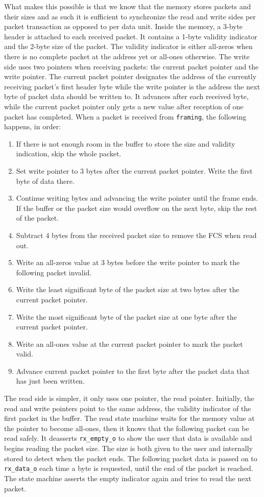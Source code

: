 \documentclass[a4paper, 11pt, oneside]{Thesis}  %
\begin{document}
What makes this possible is that we know that the memory stores packets and their sizes and as such it is sufficient to synchronize the read and write sides per packet transaction as opposed to per data unit. Inside the memory, a 3-byte header is attached to each received packet. It contains a 1-byte validity indicator and the 2-byte size of the packet. The validity indicator is either all-zeros when there is no complete packet at the address yet or all-ones otherwise. The write side uses two pointers when receiving packets: the current packet pointer and the write pointer. The current packet pointer designates the address of the currently receiving packet's first header byte while the write pointer is the address the next byte of packet data should be written to. It advances after each received byte, while the current packet pointer only gets a new value after reception of one packet has completed. When a packet is received from \texttt{framing}, the following happens, in order:
\begin{enumerate}
\item If there is not enough room in the buffer to store the size and validity indication, skip the whole packet.
\item Set write pointer to 3 bytes after the current packet pointer. Write the first byte of data there.
\item Continue writing bytes and advancing the write pointer until the frame ends. If the buffer or the packet size would overflow on the next byte, skip the rest of the packet.
\item Subtract 4 bytes from the received packet size to remove the FCS when read out.
\item Write an all-zeros value at 3 bytes before the write pointer to mark the following packet invalid.
\item Write the least significant byte of the packet size at two bytes after the current packet pointer.
\item Write the most significant byte of the packet size at one byte after the current packet pointer.
\item Write an all-ones value at the current packet pointer to mark the packet valid.
\item Advance current packet pointer to the first byte after the packet data that has just been written.
\end{enumerate}

The read side is simpler, it only uses one pointer, the read pointer. Initially, the read and write pointers point to the same address, the validity indicator of the first packet in the buffer. The read state machine waits for the memory value at the pointer to become all-ones, then it knows that the following packet can be read safely. It deasserts \texttt{rx\_empty\_o} to show the user that data is available and begins reading the packet size. The size is both given to the user and internally stored to detect when the packet ends. The following packet data is passed on to \texttt{rx\_data\_o} each time a byte is requested, until the end of the packet is reached. The state machine asserts the empty indicator again and tries to read the next packet.
\end{document}
